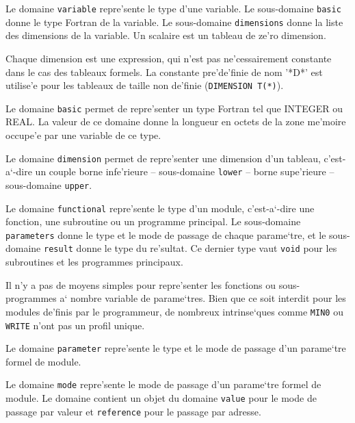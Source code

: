 {
Le domaine \verb/variable/ repre'sente le type d'une variable.  Le
sous-domaine \verb/basic/ donne le type Fortran de la variable.  Le
sous-domaine \verb/dimensions/ donne la liste des dimensions de la variable.
Un scalaire est un tableau de ze'ro dimension.

Chaque dimension est une expression, qui n'est pas ne'cessairement
constante dans le cas des tableaux formels. La constante pre'de'finie de
nom '*D*' est utilise'e pour les tableaux de taille non de'finie
(\verb/DIMENSION T(*)/).
}

{
Le domaine \verb/basic/ permet de repre'senter un type Fortran tel que
INTEGER ou REAL. La valeur de ce domaine donne la longueur en octets de
la zone me'moire occupe'e par une variable de ce type.
}

{
Le domaine \verb/dimension/ permet de repre'senter une dimension d'un
tableau, c'est-a`-dire un couple borne infe'rieure -- sous-domaine
\verb/lower/ -- borne supe'rieure -- sous-domaine \verb/upper/.
}

{ Le domaine \verb/functional/ repre'sente le type d'un module,
c'est-a`-dire une fonction, une subroutine ou un programme principal. Le
sous-domaine \verb/parameters/ donne le type et le mode de passage de
chaque parame`tre, et le sous-domaine \verb/result/ donne le type du
re'sultat. Ce dernier type vaut \verb/void/ pour les subroutines et les
programmes principaux.

Il n'y a pas de moyens simples pour repre'senter les fonctions ou
sous-programmes a` nombre variable de parame`tres. Bien que ce soit
interdit pour les modules de'finis par le programmeur, de nombreux
intrinse`ques comme \verb+MIN0+ ou \verb+WRITE+ n'ont pas un profil
unique.  }

{
Le domaine \verb/parameter/ repre'sente le type et le mode de passage d'un
parame`tre formel de module. 
}

{
Le domaine \verb/mode/ repre'sente le mode de passage d'un parame`tre
formel de module. Le domaine contient un objet du domaine \verb/value/
pour le mode de passage par valeur et \verb/reference/ pour le passage
par adresse.
}

